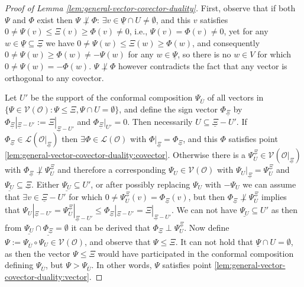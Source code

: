 \documentclass[a4paper,11pt,reqno, english]{amsart}
\theoremstyle{definition}
\theoremstyle{remark}
\begin{document}
\begin{proof}[Proof of Lemma \ref{lem:general-vector-covector-duality}]
    First, observe that if both $\Psi$ and $\Phi$ exist then $\Psi\not\perp\Phi$: $\exists v\in\underline{\Psi}\cap U\neq\emptyset$, and this $v$ satisfies $0\neq\Psi(v)\leq\Xi(v)\geq\Phi(v)\neq 0$, i.e., $\Psi(v)=\Phi(v)\neq0$, yet for any $w\in\underline{\Psi}\subseteq\underline{\Xi}$ we have $0\neq\Psi(w)\leq\Xi(w)\geq\Phi(w)$, and consequently $0\neq\Psi(w)\geq\Phi(w)\neq-\Psi(w)$ for any $w\in\underline{\Psi}$, so there is no $w\in V$ for which $0\neq\Psi(w)=-\Phi(w)$. $\Psi\not\perp\Phi$ however contradicts the fact that any vector is orthogonal to any covector.

    Let $U'$ be the support of the conformal composition $\Psi_{\overline{U}}$ of all vectors in $\{\Psi\in\mathscr{V}(\mathscr{O}):\Psi\leq\Xi,\Psi\cap U=\emptyset\}$, and define the sign vector $\Phi_{\underline{\Xi}}$ by $\Phi_{\underline{\Xi}}|_{\underline{\Xi}-U'}:=\Xi|_{\underline{\Xi}-U'}$ and $\Phi_{\underline{\Xi}}|_{U'}=0$. Then necessarily $U\subseteq\underline{\Xi}-U'$. If $\Phi_{\underline{\Xi}}\in\mathscr{L}(\mathscr{O}|_{\underline{\Xi}})$ then $\exists\Phi\in\mathscr{L}(\mathscr{O})$ with $\Phi|_{\underline{\Xi}}=\Phi_{\underline{\Xi}}$, and this $\Phi$ satisfies point \ref{lem:general-vector-covector-duality:covector}. Otherwise there is a $\Psi_U^{\underline{\Xi}}\in\mathscr{V}(\mathscr{O}|_{\underline{\Xi}})$ with $\Phi_{\underline{\Xi}}\not\perp\Psi_U^{\underline{\Xi}}$ and therefore a corresponding $\Psi_U\in\mathscr{V}(\mathscr{O})$ with $\Psi_U|_{\underline{\Xi}}=\Psi_U^{\underline{\Xi}}$ and $\underline{\Psi_U}\subseteq\underline{\Xi}$. Either $\underline{\Psi_U}\subseteq U'$, or after possibly replacing $\Psi_U$ with $-\Psi_U$ we can assume that $\exists v\in\underline{\Xi}-U'$ for which $0\neq\Psi_U^{\underline{\Xi}}(v)=\Phi_{\underline{\Xi}}(v)$, but then $\Phi_{\underline{\Xi}}\not\perp\Psi_U^{\underline{\Xi}}$ implies that $\Psi_U|_{\underline{\Xi}-U'}=\Psi_U^{\underline{\Xi}}|_{\underline{\Xi}-U'}\leq\Phi_{\underline{\Xi}}|_{\underline{\Xi}-U'}=\Xi|_{\underline{\Xi}-U'}$. We can not have $\underline{\Psi_U}\subseteq U'$ as then from $\underline{\Psi_U}\cap\underline{\Phi_{\underline{\Xi}}}=\emptyset$ it can be derived that $\Phi_{\underline{\Xi}}\perp\Psi_U^{\underline{\Xi}}$. Now define $\Psi:=\Psi_{\overline{U}}\circ\Psi_U\in\mathscr{V}(\mathscr{O})$, and observe that $\Psi\leq\Xi$. It can not hold that $\underline{\Psi}\cap U=\emptyset$, as then the vector $\Psi\leq\Xi$ would have participated in the conformal composition defining $\Psi_{\overline{U}}$, but $\Psi>\Psi_{\overline{U}}$. In other words, $\Psi$ satisfies point \ref{lem:general-vector-covector-duality:vector}.  
\end{proof}
\end{document}
